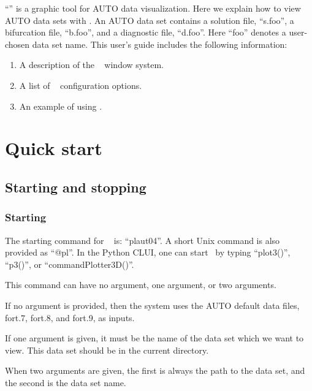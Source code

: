 

``\PLAUT'' is a graphic tool for AUTO data visualization. Here we
explain how to
view AUTO data sets with \PLAUT. An AUTO data set contains a solution file, ``s.foo'', 
a bifurcation file, ``b.foo'', and a diagnostic file, ``d.foo''. Here ``foo'' denotes a user-chosen data set name. 
This user's guide includes the following information:
\begin{enumerate}
    \item A description of the \PLAUT~ window system.
    \item A list of \PLAUT~ configuration options.
    \item An example of using \PLAUT.
\end{enumerate}

\section{Quick start}

\subsection{Starting and stopping \PLAUT }

\subsubsection{Starting}

The starting command for \PLAUT~ is: ``plaut04''. A short Unix command
is also provided as ``@pl''. In the Python CLUI, one can start \PLAUT
~by typing ``plot3()'', ``p3()'', or ``commandPlotter3D()''.
 
This command can have no argument, one argument, or two arguments. 

If no argument is provided, then the system uses the AUTO default data files,  
fort.7, fort.8, and fort.9, as inputs. 

If one argument is given, it must be the name of the data set which we want  
to view. This data set should be in the current directory.

When two arguments are given,
the first is always the path to the data set, and the second is the data set name. 

